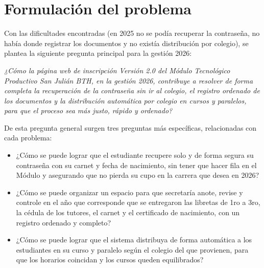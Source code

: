 \section{Formulación del problema}
\label{sec:formulacion_problema}

Con las dificultades encontradas (en 2025 no se podía recuperar la contraseña, no había donde registrar los documentos y no existía distribución por colegio), se plantea la siguiente pregunta principal para la gestión 2026:

\begin{center}
\textit{¿Cómo la página web de inscripción Versión 2.0 del Módulo Tecnológico Productivo San Julián BTH, en la gestión 2026, contribuye a resolver de forma completa la recuperación de la contraseña sin ir al colegio, el registro ordenado de los documentos y la distribución automática por colegio en cursos y paralelos, para que el proceso sea más justo, rápido y ordenado?}
\end{center}

De esta pregunta general surgen tres preguntas más específicas, relacionadas con cada problema:

\begin{itemize}
    \item ¿Cómo se puede lograr que el estudiante recupere solo y de forma segura su contraseña con su carnet y fecha de nacimiento, sin tener que hacer fila en el Módulo y asegurando que no pierda su cupo en la carrera que desea en 2026?
    \item ¿Cómo se puede organizar un espacio para que secretaría anote, revise y controle en el año que corresponde que se entregaron las libretas de 1ro a 3ro, la cédula de los tutores, el carnet y el certificado de nacimiento, con un registro ordenado y completo?
    \item ¿Cómo se puede lograr que el sistema distribuya de forma automática a los estudiantes en su curso y paralelo según el colegio del que provienen, para que los horarios coincidan y los cursos queden equilibrados?
\end{itemize}
